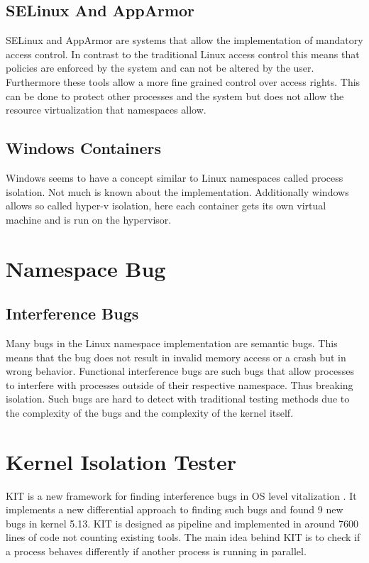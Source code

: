 \documentclass[10pt,twocolumn,a4paper]{article}
\begin{document}
\subsection{SELinux And AppArmor}
SELinux and AppArmor are systems that allow the implementation of mandatory access control. In
contrast to the traditional Linux access control this means that policies are enforced by the system
and can not be altered by the user. Furthermore these tools allow a more fine grained control over
access rights. This can be done to protect other processes and the system but does not allow the resource
virtualization that namespaces allow\cite{26}\cite{27}. 
\subsection{Windows Containers}
Windows seems to have a concept similar to Linux namespaces called process isolation. Not much is known about the
implementation. Additionally windows allows so called hyper-v isolation, here each container
gets its own virtual machine and is run on the hypervisor\cite{3}.
\section{Namespace Bug}
\subsection{Interference Bugs}
Many bugs in the Linux namespace implementation are semantic bugs.
This means that the bug does not result in invalid memory access or a crash but in wrong behavior. 
Functional interference bugs are such bugs that allow processes to interfere with processes
outside of their respective namespace. Thus breaking isolation. Such bugs are hard to detect with traditional testing methods due to the complexity of the bugs and the complexity of the kernel itself.
\section{Kernel Isolation Tester}
KIT is a new framework for finding interference bugs in OS level vitalization \cite{0}. It implements a new differential approach to finding such bugs and found 9 new bugs in kernel 5.13\cite{2}.
KIT is designed as pipeline and implemented in around 7600 lines of code not counting existing tools\cite{0}.
The main idea behind KIT is to check if a process behaves differently if another process is running
in parallel.
\end{document}
